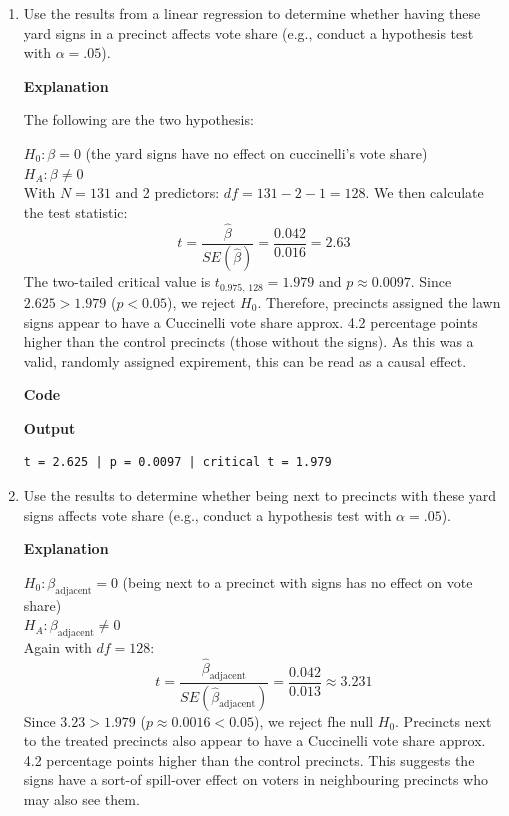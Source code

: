 \documentclass[12pt,letterpaper]{article}
\begin{document}
\vspace{.5cm}
\begin{enumerate}
	\item [(a)] Use the results from a linear regression to determine whether having these yard signs in a precinct affects vote share (e.g., conduct a hypothesis test with $\alpha = .05$).
	\vspace{.5cm}

	\textbf{Explanation}
	\vspace{.5cm}

	The following are the two hypothesis:

	$H_0: \beta = 0$ (the yard signs have no effect on cuccinelli's vote share) \\
	$H_A: \beta \neq 0$ \\

	With $N = 131$ and 2 predictors: $df = 131 - 2 - 1 = 128$. We then calculate the test statistic:
	\[
	t = \frac{\hat{\beta}}{SE(\hat{\beta})} = \frac{0.042}{0.016} = 2.63
	\]
	The two-tailed critical value is $t_{0.975,\,128} = 1.979$ and $p \approx 0.0097$. Since $2.625 > 1.979$ ($p < 0.05$), we reject $H_0$. Therefore, precincts assigned the lawn signs appear to have a Cuccinelli vote share approx. 4.2 percentage points higher than the control precincts (those without the signs). As this was a valid, randomly assigned expirement, this can be read as a causal effect.
	\vspace{1cm}

	\textbf{Code}
	
	\vspace{.5cm}
	\textbf{Output}
	\begin{verbatim}
t = 2.625 | p = 0.0097 | critical t = 1.979
	\end{verbatim}

	\newpage
	\item [(b)]  Use the results to determine whether being
	next to precincts with these yard signs affects vote
	share (e.g., conduct a hypothesis test with $\alpha = .05$).
	\vspace{.5cm}

	\textbf{Explanation}
	\vspace{.5cm}

	$H_0: \beta_{\text{adjacent}} = 0$ (being next to a precinct with signs has no effect on vote share) \\
	$H_A: \beta_{\text{adjacent}} \neq 0$ \\

	Again with $df = 128$:
	\[
	t = \frac{\hat{\beta}_{\text{adjacent}}}{SE(\hat{\beta}_{\text{adjacent}})} = \frac{0.042}{0.013} \approx 3.231
	\]
	Since $3.23 > 1.979$ ($p \approx 0.0016 < 0.05$), we reject fhe null $H_0$. Precincts next to the treated precincts also appear to have a Cuccinelli vote share approx. 4.2 percentage points higher than the control precincts. This suggests the signs have a sort-of spill-over effect on voters in neighbouring precincts who may also see them. 	
	

\end{enumerate}
\end{document}

